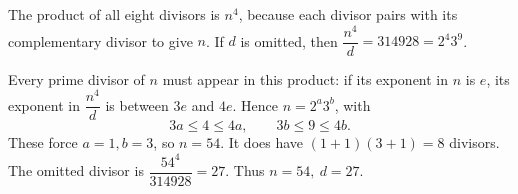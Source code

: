 The product of all eight divisors is $n^4$, because each divisor pairs with its complementary divisor to give $n$. If $d$ is omitted, then $\dfrac{n^4}{d}=314928=2^4 3^9$.

Every prime divisor of $n$ must appear in this product: if its exponent in $n$ is $e$, its exponent in $\dfrac{n^4}{d}$ is between $3e$ and $4e$. Hence $n=2^a3^b$, with
\[
3a\le4\le4a,\qquad3b\le9\le4b.
\]
These force $a=1,b=3$, so $n=54$. It does have $(1+1)(3+1)=8$ divisors. The omitted divisor is $\dfrac{54^4}{314928}=27$. Thus $\boxed{n=54,\ d=27}$.
